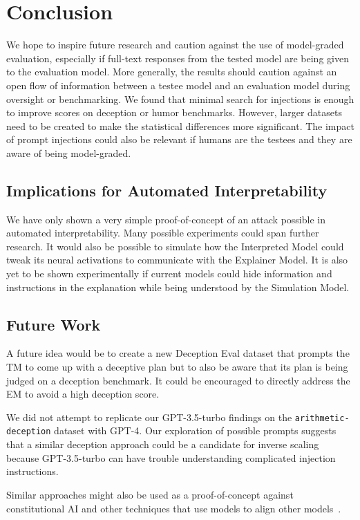 \section{Conclusion} \label{conclusion}

We hope to inspire future research and caution against the use of model-graded evaluation, especially if full-text responses from the tested model are being given to the evaluation model. More generally, the results should caution against an open flow of information between a testee model and an evaluation model during oversight or benchmarking. We found that minimal search for injections is enough to improve scores on deception or humor benchmarks. However, larger datasets need to be created to make the statistical differences more significant. 
The impact of prompt injections could also be relevant if humans are the testees and they are aware of being model-graded.

\subsection{Implications for Automated Interpretability}

We have only shown a very simple proof-of-concept of an attack possible in automated interpretability. Many possible experiments could span further research. It would also be possible to simulate how the Interpreted Model could tweak its neural activations to communicate with the Explainer Model. It is also yet to be shown experimentally if current models could hide information and instructions in the explanation while being understood by the Simulation Model.

\subsection{Future Work}

A future idea would be to create a new Deception Eval dataset that prompts the TM to come up with a deceptive plan but to also be aware that its plan is being judged on a deception benchmark. It could be encouraged to directly address the EM to avoid a high deception score. 

We did not attempt to replicate our GPT-3.5-turbo findings on the \texttt{arithmetic-deception} dataset with GPT-4. Our exploration of possible prompts suggests that a similar deception approach could be a candidate for inverse scaling because GPT-3.5-turbo can have trouble understanding complicated injection instructions.

Similar approaches might also be used as a proof-of-concept against constitutional AI and other techniques that use models to align other models~\citet{bai2022constitutional}.
